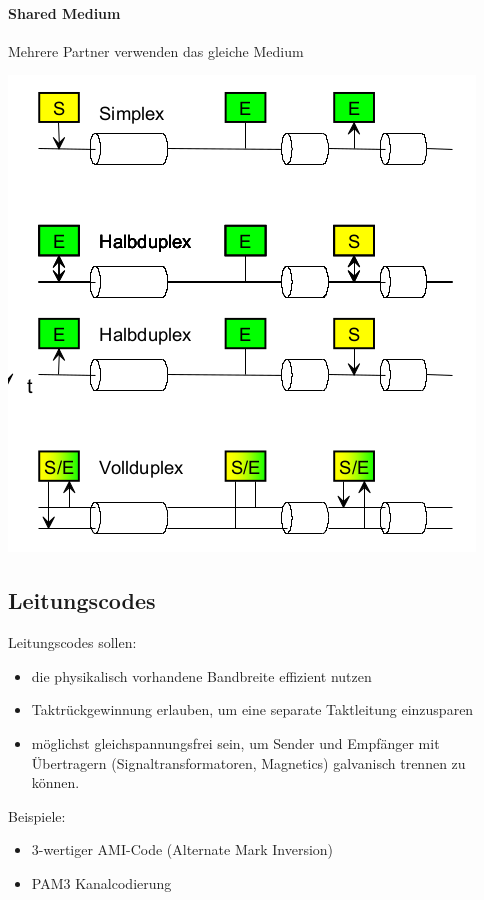 \paragraph{Shared Medium }{
    {Mehrere Partner verwenden das gleiche Medium   \\}

    \includegraphics[scale=.25]{img/kopplung_2.png}

}


\subsection{Leitungscodes}{
    Leitungscodes sollen:

    \begin{itemize}[noitemsep]
        \item die physikalisch vorhandene Bandbreite effizient nutzen
        \item Taktrückgewinnung erlauben, um eine separate Taktleitung einzusparen
        \item möglichst gleichspannungsfrei sein, um Sender und Empfänger mit Übertragern (Signaltransformatoren, Magnetics) galvanisch trennen zu können.
    \end{itemize}

    Beispiele:
    \begin{itemize}[noitemsep]
        \item 3-wertiger AMI-Code (Alternate Mark Inversion)
        \item PAM3 Kanalcodierung
    \end{itemize}
}

